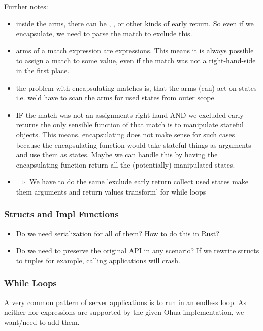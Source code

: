 Further notes:
\begin{itemize}
    \item inside the arms, there can be , ,  or other kinds of early return. So even if we encapsulate, we need to parse the match to exclude this.
    \item arms of a match expression are expressions. This means it is always possible to assign a match to some value, even if the match was not a right-hand-side in the first place.
    \item the problem with encapsulating matches is, that the arms (can) act on states i.e. we'd have to scan the arms for used states from outer scope 
    \item IF the match was not an assignments right-hand AND we excluded early returns the only sensible function of that match is to manipulate stateful objects. This means, encapsulating does not make sense for such cases because the encapsulating function would take stateful things as arguments and use them as states. Maybe we can handle this by having the encapsulating function return all the (potentially) manipulated states.
    \item[] $\Rightarrow$ We have to do the same 'exclude early return \means collect used states \means make them arguments and return values \means transform' for while loops
\end{itemize}

\subsubsection{Structs and Impl Functions}
\begin{itemize}
    \item Do we need serialization for all of them? How to do this in Rust?
    \item Do we need to preserve the original API in any scenario? If we rewrite structs to tuples for example, calling applications will crash.
\end{itemize}

\subsubsection{While Loops}
\label{subsubsec:WhileLoops}
A very common pattern of server applications is to run in an endless loop. As neither  nor  expressions are supported by the given Ohua implementation, we want/need to add them. 


